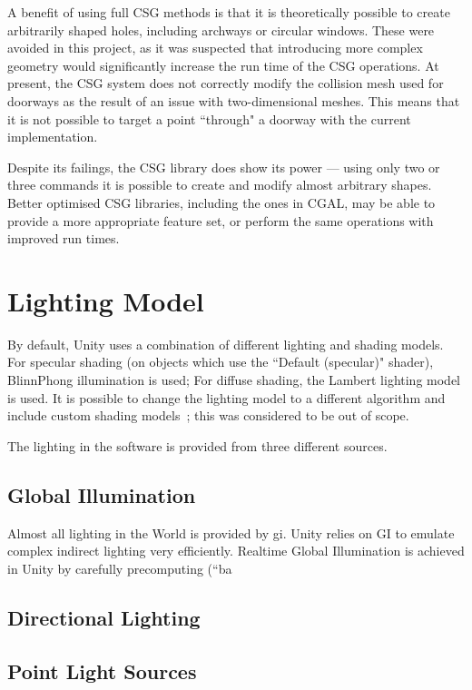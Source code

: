 A benefit of using full CSG methods is that it is theoretically possible to create arbitrarily shaped holes, including archways or circular windows. These were avoided in this project, as it was suspected that introducing more complex geometry would significantly increase the run time of the CSG operations. At present, the CSG system does not correctly modify the collision mesh used for doorways as the result of an issue with two-dimensional meshes. This means that it is not possible to target a point ``through" a doorway with the current implementation.

Despite its failings, the CSG library does show its power --- using only two or three commands it is possible to create and modify almost arbitrary shapes. Better optimised CSG libraries, including the ones in CGAL, may be able to provide a more appropriate feature set, or perform the same operations with improved run times.

\section{Lighting Model}
\label{sec:lighting}

By default, Unity uses a combination of different lighting and shading models. For specular shading (on objects which use the ``Default (specular)" shader), BlinnPhong illumination is used; For diffuse shading, the Lambert lighting model is used. It is possible to change the lighting model to a different algorithm and include custom shading models~\cite{customlighting}; this was considered to be out of scope. 

The lighting in the software is provided from three different sources.

\subsection{Global Illumination}
\label{sec:gi}

Almost all lighting in the World is provided by \acrfull{gi}. Unity relies on GI to emulate complex indirect lighting very efficiently. Realtime Global Illumination is achieved in Unity by carefully precomputing (``ba 

\subsection{Directional Lighting}
\label{dir}

\subsection{Point Light Sources}
\label{sec:points}

